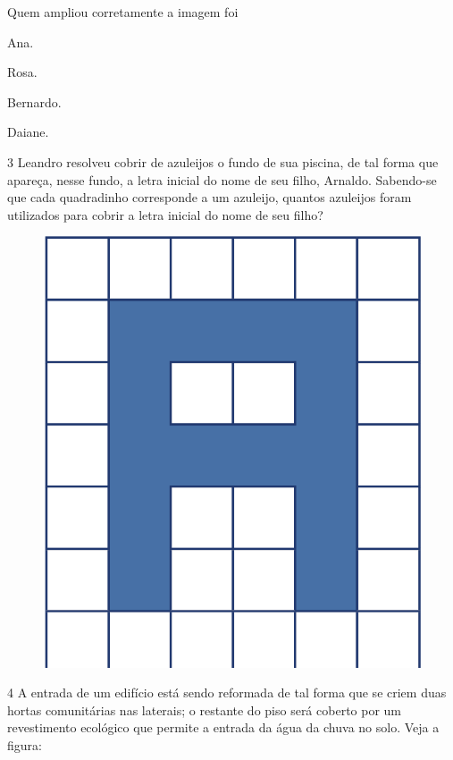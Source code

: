 Quem ampliou corretamente a imagem foi

\begin{minipage}{.5\textwidth}
\begin{escolha}
\item
  Ana.
\item
  Rosa.
\item
  Bernardo.
\item
  Daiane.
\end{escolha}
\end{minipage}

\pagebreak
\num{3} Leandro resolveu cobrir de azuleijos o fundo de sua piscina, de tal
forma que apareça, nesse fundo, a letra inicial do nome de seu filho,
Arnaldo. Sabendo-se que cada quadradinho corresponde a um azuleijo,
quantos azuleijos foram utilizados para cobrir a letra inicial do nome
de seu filho?

\begin{figure}[htpb!]
\centering
\includegraphics[width=.5\textwidth]{../ilustracoes/MAT5/SAEB_5ANO_MAT_figura37.png}
\end{figure}



\pagebreak
\num{4} A entrada de um edifício está sendo reformada de tal forma que se
criem duas hortas comunitárias nas laterais; o restante do piso será coberto por um revestimento ecológico que permite a entrada da água da chuva no solo. Veja
a figura:

